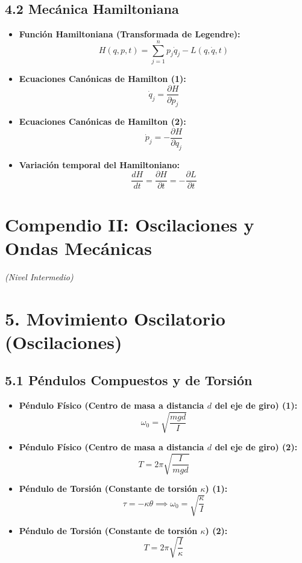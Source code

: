 \documentclass[11pt,a4paper]{article}
\begin{document}
\subsection*{4.2 Mecánica Hamiltoniana}

\begin{itemize}
  \item \textbf{Función Hamiltoniana (Transformada de Legendre):}
  \[
    H(q, p, t) = \sum_{j=1}^n p_j \dot{q}_j - L(q, \dot{q}, t)
  \]
  \item \textbf{Ecuaciones Canónicas de Hamilton (1):}
  \[
    \dot{q}_j = \frac{\partial H}{\partial p_j}
  \]
  \item \textbf{Ecuaciones Canónicas de Hamilton (2):}
  \[
    \dot{p}_j = -\frac{\partial H}{\partial q_j}
  \]
  \item \textbf{Variación temporal del Hamiltoniano:}
  \[
    \frac{dH}{dt} = \frac{\partial H}{\partial t} = -\frac{\partial L}{\partial t}
  \]
\end{itemize}

\section*{Compendio II: Oscilaciones y Ondas Mecánicas}

\textit{(Nivel Intermedio)}

\section*{5. Movimiento Oscilatorio (Oscilaciones)}

\subsection*{5.1 Péndulos Compuestos y de Torsión}

\begin{itemize}
  \item \textbf{Péndulo Físico (Centro de masa a distancia $d$ del eje de giro) (1):}
  \[
    \omega_0 = \sqrt{\frac{m g d}{I}}
  \]
  \item \textbf{Péndulo Físico (Centro de masa a distancia $d$ del eje de giro) (2):}
  \[
    T = 2\pi\sqrt{\frac{I}{m g d}}
  \]
  \item \textbf{Péndulo de Torsión (Constante de torsión $\kappa$) (1):}
  \[
    \tau = -\kappa \theta \implies \omega_0 = \sqrt{\frac{\kappa}{I}}
  \]
  \item \textbf{Péndulo de Torsión (Constante de torsión $\kappa$) (2):}
  \[
    T = 2\pi\sqrt{\frac{I}{\kappa}}
  \]
\end{itemize}
\end{document}
